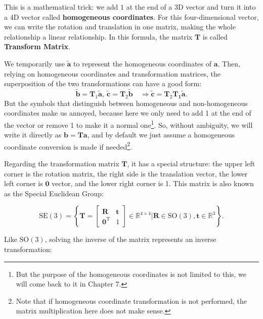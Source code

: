 This is a mathematical trick: we add $ 1 $ at the end of a 3D vector and turn it into a 4D vector called \textbf{homogeneous coordinates}. For this four-dimensional vector, we can write the rotation and translation in one matrix, making the whole relationship a linear relationship. In this formula, the matrix $ \mathbf {T} $ is called \textbf{Transform Matrix}.

We temporarily use $  \tilde { \mathbf {a} } $ to represent the homogeneous coordinates of $ \mathbf {a} $. Then, relying on homogeneous coordinates and transformation matrices, the superposition of the two transformations can have a good form:
\begin{equation}
\tilde{\mathbf{b}} = \mathbf{T}_1 \tilde{\mathbf{a}}, \  \tilde{\mathbf{c}} = \mathbf{T}_2 \tilde{\mathbf{b}} \quad \Rightarrow \tilde{\mathbf{c}} = \mathbf{T}_2 \mathbf{T_1} \tilde{\mathbf{a}}.
\end{equation}
But the symbols that distinguish between homogeneous and non-homogeneous coordinates make us annoyed, because here we only need to add 1 at the end of the vector or remove 1 to make it a normal one\footnote {But the purpose of the homogeneous coordinates is not limited to this, we will come back to it in Chapter 7.}. So, without ambiguity, we will write it directly as $ \mathbf {b}= \mathbf {T} \mathbf {a} $, and by default we just assume a homogeneous coordinate conversion is made if needed\footnote { Note that if homogeneous coordinate transformation is not performed, the matrix multiplication here does not make sense. }.

Regarding the transformation matrix $ \mathbf{T} $, it has a special structure: the upper left corner is the rotation matrix, the right side is the translation vector, the lower left corner is $ \mathbf{0} $ vector, and the lower right corner is 1. This matrix is also known as the Special Euclidean Group:

\begin{equation}
\mathrm{SE}(3) = \left\{ \mathbf{T} = \left[ {\begin{array}{*{20}{c}}
    \mathbf{R} & \mathbf{t} \\
    {{\mathbf{0}^\mathrm{T}}} & 1
    \end{array}} \right]
\in \mathbb{R}^{4 \times 4} | \mathbf{R} \in \mathrm{SO}(3), \mathbf{t} \in \mathbb{R}^3\right\} .
\end{equation}

Like $ \mathrm{SO}( 3 ) $, solving the inverse of the matrix represents an inverse transformation:

